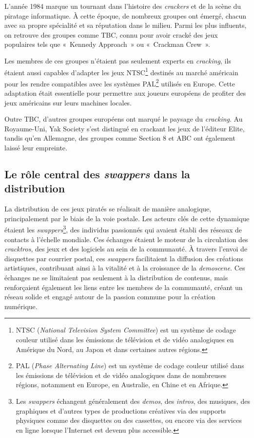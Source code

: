 L'année 1984 marque un tournant dans l'histoire des \textit{crackers} et de la scène du piratage informatique. À cette époque, de nombreux groupes ont émergé, chacun avec sa propre spécialité et sa réputation dans le milieu. Parmi les plus influents, on retrouve des groupes comme TBC, connu pour avoir cracké des jeux populaires tels que «~Kennedy Approach~» ou «~Crackman Crew~».

Les membres de ces groupes n'étaient pas seulement experts en \textit{cracking}, ils étaient aussi capables d'adapter les jeux NTSC\footnote{NTSC (\textit{National Television System Committee}) est un système de codage couleur utilisé dans les émissions de télévision et de vidéo analogiques en Amérique du Nord, au Japon et dans certaines autres régions.} destinés au marché américain pour les rendre compatibles avec les systèmes PAL\footnote{PAL (\textit{Phase Alternating Line}) est un système de codage couleur utilisé dans les émissions de télévision et de vidéo analogiques dans de nombreuses régions, notamment en Europe, en Australie, en Chine et en Afrique.} utilisés en Europe. Cette adaptation était essentielle pour permettre aux joueurs européens de profiter des jeux américains sur leurs machines locales.

Outre TBC, d'autres groupes européens ont marqué le paysage du \textit{cracking}. Au Royaume-Uni, Yak Society s'est distingué en crackant les jeux de l'éditeur Elite, tandis qu'en Allemagne, des groupes comme Section 8 et ABC ont également laissé leur empreinte.


\subsection*{Le rôle central des \textit{swappers} dans la distribution}



La distribution de ces jeux piratés se réalisait de manière analogique, principalement par le biais de la voie postale. Les acteurs clés de cette dynamique étaient les \textit{swappers}\footnote{Les \textit{swappers} échangent généralement des \textit{demos}, des \textit{intros}, des musiques, des graphiques et d'autres types de productions créatives via des supports physiques comme des disquettes ou des cassettes, ou encore via des services en ligne lorsque l'Internet est devenu plus accessible.}, des individus passionnés qui avaient établi des réseaux de contacts à l'échelle mondiale. Ces échanges étaient le moteur de la circulation des \textit{cracktros}, des jeux et des logiciels au sein de la communauté. À travers l'envoi de disquettes par courrier postal, ces \textit{swappers} facilitaient la diffusion des créations artistiques, contribuant ainsi à la vitalité et à la croissance de la \textit{demoscene}. Ces échanges ne se limitaient pas seulement à la distribution de contenus, mais renforçaient également les liens entre les membres de la communauté, créant un réseau solide et engagé autour de la passion commune pour la création numérique.

